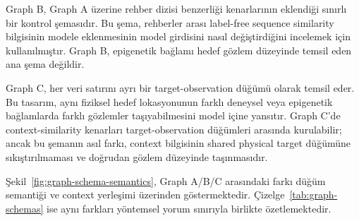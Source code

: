 Graph B, Graph A üzerine rehber dizisi benzerliği kenarlarının eklendiği sınırlı bir kontrol şemasıdır. Bu şema, rehberler arası label-free sequence similarity bilgisinin modele eklenmesinin model girdisini nasıl değiştirdiğini incelemek için kullanılmıştır. Graph B, epigenetik bağlamı hedef gözlem düzeyinde temsil eden ana şema değildir.

Graph C, her veri satırını ayrı bir target-observation düğümü olarak temsil eder. Bu tasarım, aynı fiziksel hedef lokasyonunun farklı deneysel veya epigenetik bağlamlarda farklı gözlemler taşıyabilmesini model içine yansıtır. Graph C'de context-similarity kenarları target-observation düğümleri arasında kurulabilir; ancak bu şemanın asıl farkı, context bilgisinin shared physical target düğümüne sıkıştırılmaması ve doğrudan gözlem düzeyinde taşınmasıdır.

Şekil~\ref{fig:graph-schema-semantics}, Graph A/B/C arasındaki farkı düğüm semantiği ve context yerleşimi üzerinden göstermektedir. Çizelge~\ref{tab:graph-schemas} ise aynı farkları yöntemsel yorum sınırıyla birlikte özetlemektedir.

